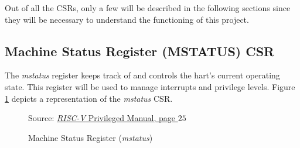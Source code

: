 Out of all the CSRs, only a few will be described in the following sections since
they will be necessary to understand the functioning of this project.

\subsection{Machine Status Register (MSTATUS) CSR}
\label{subsec:mstatus}

The \textit{mstatus} register keeps track of and controls the hart's current operating
state. This register will be used to manage interrupts and privilege levels. Figure
\ref{fig:mstatus} depicts a representation of the \textit{mstatus} CSR. \\
\begin{figure}[H]
  \centering
  \def\stackalignment{r} %
  {\scriptsize Source: \href{https://drive.google.com/file/d/17GeetSnT5wW3xNuAHI95-SI1gPGd5sJ_/view}{\textit{RISC-V} Privileged Manual, page $25$}}
  \caption{Machine Status Register (\textit{mstatus})}
  \label{fig:mstatus}
\end{figure}

